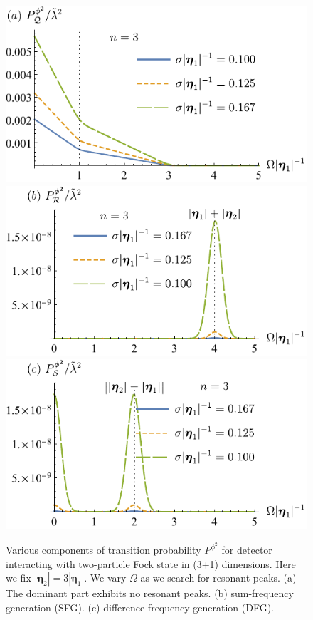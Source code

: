 \documentclass[prd,twocolumn,superscriptaddress,nofootinbib,floatfix,amsmath,amssymb]{revtex4-2}
\newcommand{\ba}{{\bm{\eta}_1}}
\newcommand{\bb}{{\bm{\eta}_2}}
\begin{document}
        
    \begin{figure}[tp]
        \centering
        \includegraphics[scale=0.64]{Fig5a.pdf}
        \includegraphics[scale=0.64]{Fig5b.pdf}
        \includegraphics[scale=0.64]{Fig5c.pdf}
        \caption{Various components of transition probability $P^{\phi^2}$ for detector interacting with two-particle Fock state in (3+1) dimensions. Here we fix $|\bb|=3|\ba|$. We vary $\Omega$ as we search for resonant peaks. (a) The dominant part exhibits no resonant peaks. (b) sum-frequency generation (SFG). (c) difference-frequency generation (DFG).}
        \label{fig: quad-resonance-QRS-3D}
    \end{figure}    
 
\end{document}

